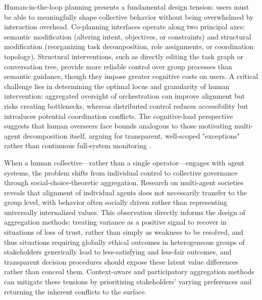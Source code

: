 \documentclass[11pt,a4paper]{article}
\begin{document}
Human-in-the-loop planning presents a fundamental design tension: users must be able to meaningfully shape collective behavior without being overwhelmed by interaction overhead. Co-planning interfaces operate along two principal axes: semantic modification (altering intent, objectives, or constraints) and structural modification (reorganizing task decomposition, role assignments, or coordination topology). Structural interventions, such as directly editing the task graph or conversation tree, provide more reliable control over group processes than semantic guidance, though they impose greater cognitive costs on users. A critical challenge lies in determining the optimal locus and granularity of human intervention: aggregated oversight of orchestration can improve alignment but risks creating bottlenecks, whereas distributed control reduces accessibility but introduces potential coordination conflicts. The cognitive-load perspective suggests that human overseers face bounds analogous to those motivating multi-agent decomposition itself, arguing for transparent, well-scoped "exceptions" rather than continuous full-system monitoring \cite{arxiv:2506.06843v3,arxiv:2601.00481v1}.

When a human collective---rather than a single operator---engages with agent systems, the problem shifts from individual control to collective governance through social-choice-theoretic aggregation. Research on multi-agent societies reveals that alignment of individual agents does not necessarily transfer to the group level, with behavior often socially driven rather than representing universally internalized values. This observation directly informs the design of aggregation methods: treating variance as a positive signal to recover in situations of loss of trust, rather than simply as weakness to be resolved, and thus situations requiring globally ethical outcomes in heterogeneous groups of stakeholders generically lead to less-satisfying and less-fair outcomes, and transparent decision procedures should expose these latent value differences rather than conceal them. Context-aware and participatory aggregation methods can mitigate these tensions by prioritizing stakeholders' varying preferences and returning the inherent conflicts to the surface.
\end{document}

